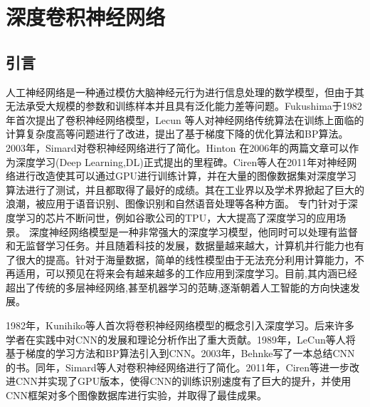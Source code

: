 \chapter{深度卷积神经网络}
\section{引言}


人工神经网络\cite{hebb2005organization}是一种通过模仿大脑神经元行为进行信息处理的数学模型，但由于其无法承受大规模的参数和训练样本并且具有泛化能力差等问题。Fukushima\cite{fukushima1982neocognitron}于1982年首次提出了卷积神经网络模型，Lecun 等人对神经网络传统算法在训练上面临的计算复杂度高等问题进行了改进，提出了基于梯度下降的优化算法\cite{lecun1998gradient}和BP算法\cite{lecun1989backpropagation}。2003年，Simard对卷积神经网络进行了简化\cite{simard2003best}。Hinton 在2006年的两篇文章\cite{hinton2006reducing,hinton2006fast}可以作为深度学习(Deep Learning,DL)正式提出的里程碑。Ciren等人\cite{ciresan2011flexible}在2011年对神经网络进行改造使其可以通过GPU进行训练计算，并在大量的图像数据集对深度学习算法进行了测试，并且都取得了最好的成绩。其在工业界以及学术界掀起了巨大的浪潮，被应用于语音识别\cite{hinton2012deep}、图像识别\cite{krizhevsky2012imagenet}和自然语音处理\cite{collobert2011natural}等各种方面。 专门针对于深度学习的芯片不断问世，例如谷歌公司的TPU\cite{jouppi2017datacenter}，大大提高了深度学习的应用场景。
深度神经网络模型是一种非常强大的深度学习模型，他同时可以处理有监督和无监督学习任务。并且随着科技的发展，数据量越来越大，计算机并行能力也有了很大的提高。针对于海量数据，简单的线性模型由于无法充分利用计算能力，不再适用，可以预见在将来会有越来越多的工作应用到深度学习。目前,其内涵已经超出了传统的多层神经网络,甚至机器学习的范畴,逐渐朝着人工智能的方向快速发展\cite{silver2017mastering}。

1982年，Kunihiko等人\cite{fukushima1982neocognitron}首次将卷积神经网络模型的概念引入深度学习。后来许多学者在实践中对CNN的发展和理论分析作出了重大贡献。1989年，LeCun等人将基于梯度的学习方法\cite{lecun1998gradient}和BP算法\cite{lecun1989backpropagation}引入到CNN。2003年，Behnke写了一本总结CNN\cite{behnke2003hierarchical}的书。同年，Simard等人\cite{simard2003best}对卷积神经网络进行了简化。2011年，Ciren等\cite{ciresan2011flexible}进一步改进CNN并实现了GPU版本，使得CNN的训练识别速度有了巨大的提升，并使用CNN框架对多个图像数据库进行实验，并取得了最佳成果。

